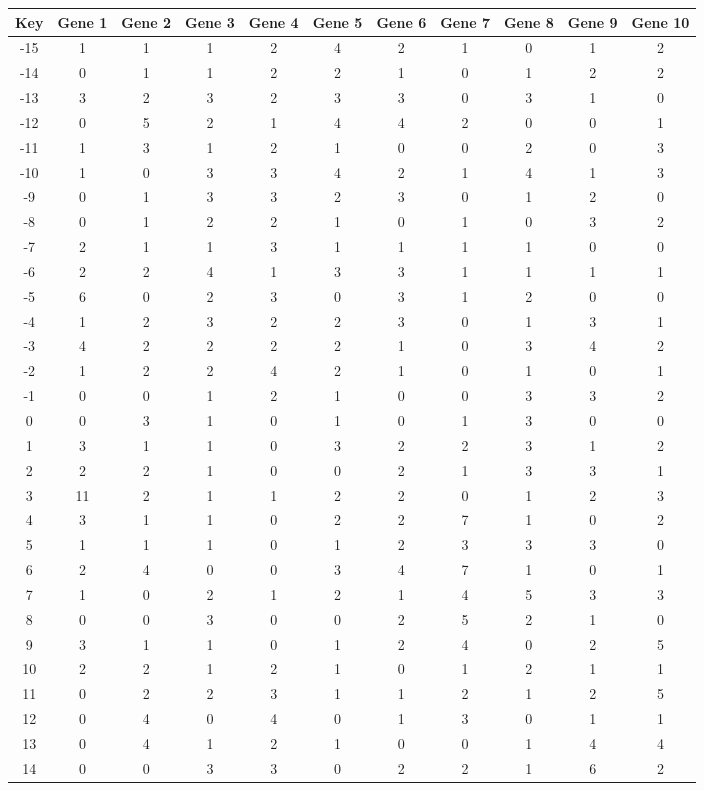 \begin{tabular}{|c|c|c|c|c|c|c|c|c|c|c|}
\hline
Key & Gene 1 & Gene 2 & Gene 3 & Gene 4 & Gene 5 & Gene 6 & Gene 7 & Gene 8 & Gene 9 & Gene 10 \\
\hline
-15 & 1 & 1 & 1 & 2 & 4 & 2 & 1 & 0 & 1 & 2 \\
-14 & 0 & 1 & 1 & 2 & 2 & 1 & 0 & 1 & 2 & 2 \\
-13 & 3 & 2 & 3 & 2 & 3 & 3 & 0 & 3 & 1 & 0 \\
-12 & 0 & 5 & 2 & 1 & 4 & 4 & 2 & 0 & 0 & 1 \\
-11 & 1 & 3 & 1 & 2 & 1 & 0 & 0 & 2 & 0 & 3 \\
-10 & 1 & 0 & 3 & 3 & 4 & 2 & 1 & 4 & 1 & 3 \\
-9 & 0 & 1 & 3 & 3 & 2 & 3 & 0 & 1 & 2 & 0 \\
-8 & 0 & 1 & 2 & 2 & 1 & 0 & 1 & 0 & 3 & 2 \\
-7 & 2 & 1 & 1 & 3 & 1 & 1 & 1 & 1 & 0 & 0 \\
-6 & 2 & 2 & 4 & 1 & 3 & 3 & 1 & 1 & 1 & 1 \\
-5 & 6 & 0 & 2 & 3 & 0 & 3 & 1 & 2 & 0 & 0 \\
-4 & 1 & 2 & 3 & 2 & 2 & 3 & 0 & 1 & 3 & 1 \\
-3 & 4 & 2 & 2 & 2 & 2 & 1 & 0 & 3 & 4 & 2 \\
-2 & 1 & 2 & 2 & 4 & 2 & 1 & 0 & 1 & 0 & 1 \\
-1 & 0 & 0 & 1 & 2 & 1 & 0 & 0 & 3 & 3 & 2 \\
0 & 0 & 3 & 1 & 0 & 1 & 0 & 1 & 3 & 0 & 0 \\
1 & 3 & 1 & 1 & 0 & 3 & 2 & 2 & 3 & 1 & 2 \\
2 & 2 & 2 & 1 & 0 & 0 & 2 & 1 & 3 & 3 & 1 \\
3 & 11 & 2 & 1 & 1 & 2 & 2 & 0 & 1 & 2 & 3 \\
4 & 3 & 1 & 1 & 0 & 2 & 2 & 7 & 1 & 0 & 2 \\
5 & 1 & 1 & 1 & 0 & 1 & 2 & 3 & 3 & 3 & 0 \\
6 & 2 & 4 & 0 & 0 & 3 & 4 & 7 & 1 & 0 & 1 \\
7 & 1 & 0 & 2 & 1 & 2 & 1 & 4 & 5 & 3 & 3 \\
8 & 0 & 0 & 3 & 0 & 0 & 2 & 5 & 2 & 1 & 0 \\
9 & 3 & 1 & 1 & 0 & 1 & 2 & 4 & 0 & 2 & 5 \\
10 & 2 & 2 & 1 & 2 & 1 & 0 & 1 & 2 & 1 & 1 \\
11 & 0 & 2 & 2 & 3 & 1 & 1 & 2 & 1 & 2 & 5 \\
12 & 0 & 4 & 0 & 4 & 0 & 1 & 3 & 0 & 1 & 1 \\
13 & 0 & 4 & 1 & 2 & 1 & 0 & 0 & 1 & 4 & 4 \\
14 & 0 & 0 & 3 & 3 & 0 & 2 & 2 & 1 & 6 & 2 \\
\hline
\end{tabular}